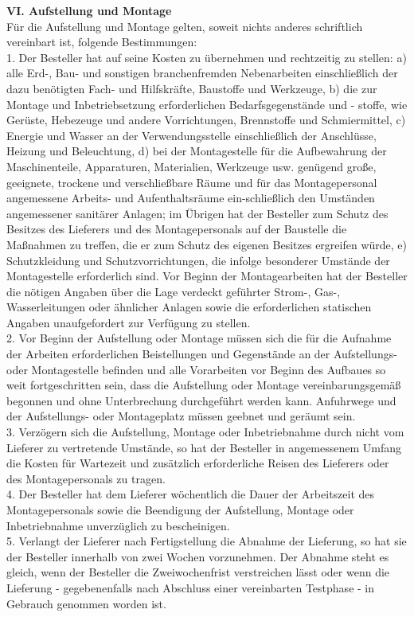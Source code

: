 \begin{multicols}{2}
\begin{scriptsize}
	\textbf{VI. Aufstellung und Montage}\\
	Für die Aufstellung und Montage gelten, soweit nichts anderes schriftlich vereinbart ist, folgende Bestimmungen:\\
	1. Der Besteller hat auf seine Kosten zu übernehmen und rechtzeitig zu stellen: a) alle Erd-, Bau- und sonstigen branchenfremden Nebenarbeiten einschließlich der dazu benötigten Fach- und Hilfskräfte, Baustoffe und Werkzeuge, b) die zur Montage und Inbetriebsetzung erforderlichen Bedarfsgegenstände und - stoffe, wie Gerüste, Hebezeuge und andere Vorrichtungen, Brennstoffe und Schmiermittel, c) Energie und Wasser an der Verwendungsstelle einschließlich der Anschlüsse, Heizung und Beleuchtung, d) bei der Montagestelle für die Aufbewahrung der Maschinenteile, Apparaturen, Materialien, Werkzeuge usw. genügend große, geeignete, trockene und verschließbare Räume und für das Montagepersonal angemessene Arbeits- und Aufenthaltsräume ein-schließlich den Umständen angemessener sanitärer Anlagen; im Übrigen hat der Besteller zum Schutz des Besitzes des Lieferers und des Montagepersonals auf der Baustelle die Maßnahmen zu treffen, die er zum Schutz des eigenen Besitzes ergreifen würde, e) Schutzkleidung und Schutzvorrichtungen, die infolge besonderer Umstände der Montagestelle erforderlich sind. Vor Beginn der Montagearbeiten hat der Besteller die nötigen Angaben über die Lage verdeckt geführter Strom-, Gas-, Wasserleitungen oder ähnlicher Anlagen sowie die erforderlichen statischen Angaben unaufgefordert zur Verfügung zu stellen.\\
	2. Vor Beginn der Aufstellung oder Montage müssen sich die für die Aufnahme der Arbeiten erforderlichen Beistellungen und Gegenstände an der Aufstellungs- oder Montagestelle befinden und alle Vorarbeiten vor Beginn des Aufbaues so weit fortgeschritten sein, dass die Aufstellung oder Montage vereinbarungsgemäß begonnen und ohne Unterbrechung durchgeführt werden kann. Anfuhrwege und der Aufstellungs- oder Montageplatz müssen geebnet und geräumt sein.\\
	3. Verzögern sich die Aufstellung, Montage oder Inbetriebnahme durch nicht vom Lieferer zu vertretende Umstände, so hat der Besteller in angemessenem Umfang die Kosten für Wartezeit und zusätzlich erforderliche Reisen des Lieferers oder des Montagepersonals zu tragen.\\
	4. Der Besteller hat dem Lieferer wöchentlich die Dauer der Arbeitszeit des Montagepersonals sowie die Beendigung der Aufstellung, Montage oder Inbetriebnahme unverzüglich zu bescheinigen.\\
	5. Verlangt der Lieferer nach Fertigstellung die Abnahme der Lieferung, so hat sie der Besteller innerhalb von zwei Wochen vorzunehmen. Der Abnahme steht es gleich, wenn der Besteller die Zweiwochenfrist verstreichen lässt oder wenn die Lieferung - gegebenenfalls nach Abschluss einer vereinbarten Testphase - in Gebrauch genommen worden ist.
	

\end{scriptsize}
\end{multicols}
